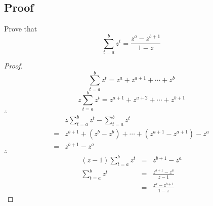 \subsection{Proof}
Prove that \[\sum\limits_{t = a}^b{z^t} = \frac{z^a - z^{b + 1}}{1 - z}\]

\begin{proof}
    \[
        \sum\limits_{t = a}^b{z^t} = z^a + z^{a + 1} + \cdots + z^b
    \]
    \[
        z\sum\limits_{t = a}^b{z^t} = z^{a + 1} + z^{a + 2} + \cdots + z^{b + 1}
    \]
    $\therefore$
    \[
        \begin{array}{ll}
            &z\sum\limits_{t = a}^b{z^t} - \sum\limits_{t = a}^b{z^t}\\
            = &
            z^{b + 1} + (z^b - z^b) + \cdots + (z^{a + 1} - z^{a + 1}) - z^a\\
            = &z^{b + 1} - z^a
        \end{array}
    \]
    $\therefore$
    \[
        \begin{array}{lll}
            (z - 1)\sum\limits_{t = a}^b{z^t} &= &z^{b + 1} - z^a\\
            \sum\limits_{t = a}^b{z^t} &= &
            \frac{z^{b + 1} - z^a}{z - 1}\\
            &= &\frac{z^a - z^{b + 1}}{1 - z}
        \end{array}
    \]
\end{proof}


